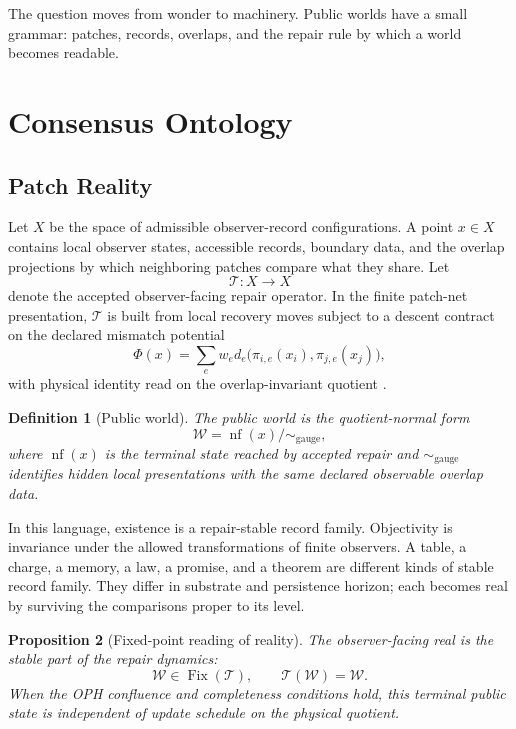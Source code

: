 \documentclass[11pt]{article}
\newtheorem{definition}{Definition}[section]
\newtheorem{proposition}[definition]{Proposition}
\theoremstyle{remark}
\theoremstyle{plain}
\newcommand{\World}{\mathcal W}
\newcommand{\Repair}{\mathcal T}
\newcommand{\NF}{\operatorname{nf}}
\newcommand{\Fix}{\operatorname{Fix}}
\begin{document}
The question moves from wonder to machinery. Public worlds have a small
grammar: patches, records, overlaps, and the repair rule by which a world
becomes readable.

\section{Consensus Ontology}

\subsection{Patch Reality}

Let \(X\) be the space of admissible observer-record configurations. A point
\(x\in X\) contains local observer states, accessible records, boundary data,
and the overlap projections by which neighboring patches compare what they
share. Let
\[
\Repair:X\to X
\]
denote the accepted observer-facing repair operator. In the finite patch-net
presentation, \(\Repair\) is built from local recovery moves subject to a
descent contract on the declared mismatch potential
\[
\Phi(x)=\sum_e w_e d_e\bigl(\pi_{i,e}(x_i),\pi_{j,e}(x_j)\bigr),
\]
with physical identity read on the overlap-invariant quotient
\cite{OPHConsensus}.

\begin{definition}[Public world]
The public world is the quotient-normal form
\[
\World=\NF(x)\big/\!\sim_{\mathrm{gauge}},
\]
where \(\NF(x)\) is the terminal state reached by accepted repair and
\(\sim_{\mathrm{gauge}}\) identifies hidden local presentations with the same
declared observable overlap data.
\end{definition}

In this language, existence is a repair-stable record family. Objectivity is
invariance under the allowed transformations of finite observers. A table, a
charge, a memory, a law, a promise, and a theorem are different kinds of stable
record family. They differ in substrate and persistence horizon; each becomes
real by surviving the comparisons proper to its level.

\begin{proposition}[Fixed-point reading of reality]
The observer-facing real is the stable part of the repair dynamics:
\[
\World\in\Fix(\Repair), \qquad \Repair(\World)=\World .
\]
When the OPH confluence and completeness conditions hold, this terminal public
state is independent of update schedule on the physical quotient.
\end{proposition}
\end{document}

